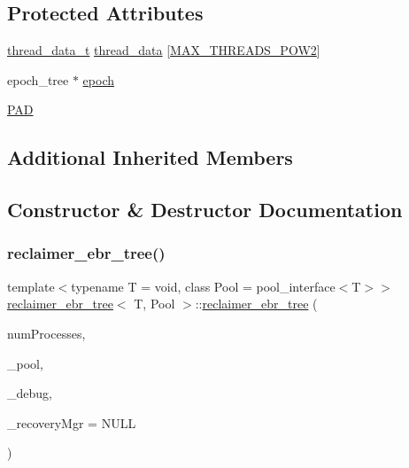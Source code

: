 \subsection*{Protected Attributes}
\begin{DoxyCompactItemize}
\item 
\hyperlink{structthread__data__t}{thread\+\_\+data\+\_\+t} \hyperlink{classreclaimer__ebr__tree_a3ec46853a0bf878335338c3b89debed7}{thread\+\_\+data} \mbox{[}\hyperlink{plaf_8h_ac1585a3455dd3e33e877e588be9e466b}{M\+A\+X\+\_\+\+T\+H\+R\+E\+A\+D\+S\+\_\+\+P\+O\+W2}\mbox{]}
\item 
epoch\+\_\+tree $\ast$ \hyperlink{classreclaimer__ebr__tree_a83b6dbb2cda5383592a2aed9d5d66402}{epoch}
\item 
\hyperlink{classreclaimer__ebr__tree_a574b9ffbb2e9390a01476454383cabef}{P\+AD}
\end{DoxyCompactItemize}
\subsection*{Additional Inherited Members}


\subsection{Constructor \& Destructor Documentation}
\mbox{\label{classreclaimer__ebr__tree_ac1b054e2dade349fdb777185707fed46}} 
\subsubsection{\texorpdfstring{reclaimer\+\_\+ebr\+\_\+tree()}{reclaimer\_ebr\_tree()}}
{\footnotesize\ttfamily template$<$typename T  = void, class Pool  = pool\+\_\+interface$<$\+T$>$$>$ \\
\hyperlink{classreclaimer__ebr__tree}{reclaimer\+\_\+ebr\+\_\+tree}$<$ T, Pool $>$\+::\hyperlink{classreclaimer__ebr__tree}{reclaimer\+\_\+ebr\+\_\+tree} (\begin{DoxyParamCaption}\item[{const int}]{num\+Processes,  }\item[{Pool $\ast$}]{\+\_\+pool,  }\item[{\hyperlink{classdebugInfo}{debug\+Info} $\ast$const}]{\+\_\+debug,  }\item[{\hyperlink{classRecoveryMgr}{Recovery\+Mgr}$<$ void $\ast$$>$ $\ast$const}]{\+\_\+recovery\+Mgr = {\ttfamily NULL} }\end{DoxyParamCaption})\hspace{0.3cm}{\ttfamily [inline]}}

